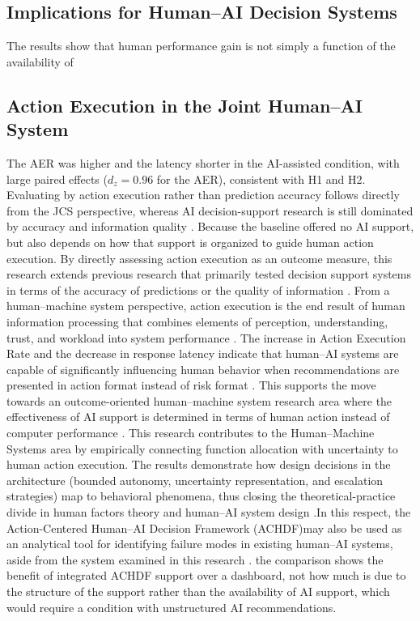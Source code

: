 \documentclass[journal]{IEEEtran}
\theoremstyle{plain}
\theoremstyle{definition}
\providecommand{\DIFaddtex}[1]{{\protect\color{blue} \sf #1}} %
\providecommand{\DIFdeltex}[1]{{\protect\color{red} \scriptsize #1}} %
\providecommand{\DIFaddbegin}{} %
\providecommand{\DIFaddend}{} %
\providecommand{\DIFdelbegin}{} %
\providecommand{\DIFdelend}{} %
\providecommand{\DIFadd}[1]{\texorpdfstring{\DIFaddtex{#1}}{#1}} %
\providecommand{\DIFdel}[1]{\texorpdfstring{\DIFdeltex{#1}}{}} %
\newcommand{\DIFscaledelfig}{0.5}
\newlength{\DIFdelgraphicswidth} %
\newlength{\DIFdelgraphicsheight} %
\newcommand{\DIFaddincludegraphics}[2][]{{\color{blue}\fbox{\DIFOincludegraphics[#1]{#2}}}} %
\newcommand{\DIFdelincludegraphics}[2][]{%
\sbox{\DIFdelgraphicsbox}{\DIFOincludegraphics[#1]{#2}}%
\settoboxwidth{\DIFdelgraphicswidth}{\DIFdelgraphicsbox} %
\settoboxtotalheight{\DIFdelgraphicsheight}{\DIFdelgraphicsbox} %
\scalebox{\DIFscaledelfig}{%
\parbox[b]{\DIFdelgraphicswidth}{\usebox{\DIFdelgraphicsbox}\\[-\baselineskip] \rule{\DIFdelgraphicswidth}{0em}}\llap{\resizebox{\DIFdelgraphicswidth}{\DIFdelgraphicsheight}{%
\setlength{\unitlength}{\DIFdelgraphicswidth}%
\begin{picture}(1,1)%
\thicklines\linethickness{2pt} %
{\color[rgb]{1,0,0}\put(0,0){\framebox(1,1){}}}%
{\color[rgb]{1,0,0}\put(0,0){\line( 1,1){1}}}%
{\color[rgb]{1,0,0}\put(0,1){\line(1,-1){1}}}%
\end{picture}%
}\hspace*{3pt}}} %
} %
\DeclareRobustCommand{\DIFaddbegin}{\DIFOaddbegin \let\includegraphics\DIFaddincludegraphics} %
\DeclareRobustCommand{\DIFaddend}{\DIFOaddend \let\includegraphics\DIFOincludegraphics} %
\DeclareRobustCommand{\DIFdelbegin}{\DIFOdelbegin \let\includegraphics\DIFdelincludegraphics} %
\DeclareRobustCommand{\DIFdelend}{\DIFOaddend \let\includegraphics\DIFOincludegraphics} %
\begin{document}
\DIFdelbegin \subsection{\DIFdel{Implications for Human--AI Decision Systems}}
\addtocounter{subsection}{-1}%
\DIFdel{The results show that human performance gain is not simply a function of the availability of }\DIFdelend \DIFaddbegin \subsection{\DIFadd{Action Execution in the Joint Human--AI System}}
\DIFadd{The AER was higher and the latency shorter in the AI-assisted condition, with large paired effects ($d_z=0.96$ for the AER), consistent with H1 and H2. Evaluating by action execution rather than prediction accuracy follows directly from the JCS perspective, whereas AI decision-support research is still dominated by accuracy and information quality \cite{Lai2023FAccT,Muller2022CHIWORK,Yang2022THMSReview}. Because the baseline offered no }\DIFaddend AI support, \DIFdelbegin \DIFdel{but also depends on how that support is organized to guide human action execution. By directly assessing action execution as an outcome measure, this research extends previous research that primarily tested decision support systems in terms of the accuracy of predictions or the quality of information \cite{Lai2023FAccT,Muller2022CHIWORK,Yang2022THMSReview}.
From a human--machine system perspective, action execution is the end result of human information processing that combines elements of perception, understanding, trust, and workload into system performance \cite{Hodgson2013THMS,Bach2024Access}. The increase in Action Execution Rate and the decrease in response latency indicate that human--AI systems are capable of significantly influencing human behavior when recommendations are presented in action format instead of risk format . This supports the move towards an outcome-oriented human--machine system research area where the effectiveness of AI support is determined in terms of human action instead of computer performance \cite{Lai2023FAccT,Yang2022THMSReview}. This research contributes to the Human--Machine Systems area by empirically connecting function allocation with uncertainty to human action execution.
The results demonstrate how design decisions in the architecture (bounded autonomy, uncertainty representation, and escalation strategies) map to behavioral phenomena, thus closing the theoretical-practice divide in human factors theory and human--AI system design \cite{Bach2024Access,Assaad2023TAS,Zhang2022THMS}.In this respect, the Action-Centered Human--AI Decision Framework (ACHDF)may also be used as an analytical tool for identifying failure modes in existing human--AI systems, aside from the system examined in this research \cite{Yang2022THMSReview,Lai2023FAccT}.
}\DIFdelend \DIFaddbegin \DIFadd{the comparison shows the benefit of integrated ACHDF support over a dashboard, not how much is due to the structure of the support rather than the availability of AI support, which would require a condition with unstructured AI recommendations.
}\DIFaddend 
\end{document}
